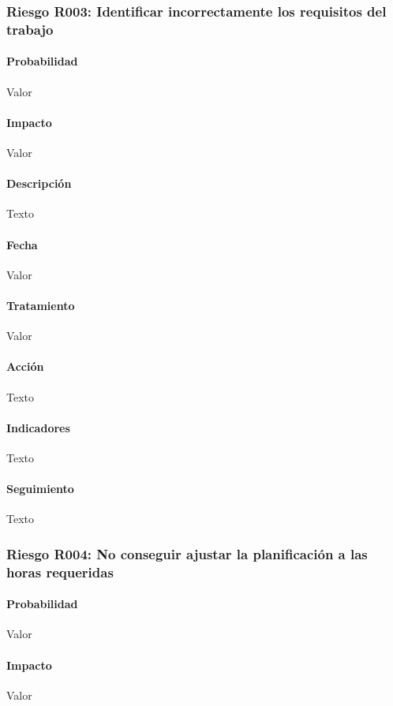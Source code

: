 \documentclass[10pt,a4paper]{article}
\begin{document}
				\subsubsection{Riesgo R003: Identificar incorrectamente los requisitos del trabajo }
				\paragraph{Probabilidad} Valor
				\paragraph{Impacto}	Valor
				\paragraph{Descripción} Texto
				\paragraph{Fecha} Valor %
				\paragraph{Tratamiento} Valor %
				\paragraph{Acción} Texto %
				\paragraph{Indicadores} Texto %
				\paragraph{Seguimiento}	Texto %
				
				\subsubsection{Riesgo R004: No conseguir ajustar la planificación a las horas requeridas }
				\paragraph{Probabilidad} Valor
				\paragraph{Impacto}	Valor
\end{document}
